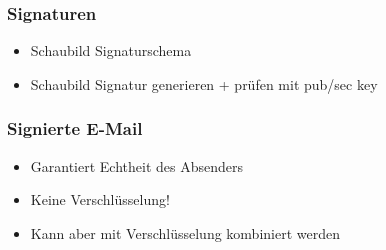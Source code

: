 \begin{frame}
  \frametitle{Signaturen}
  \begin{itemize}
    \item Schaubild Signaturschema
    \item Schaubild Signatur generieren + prüfen mit pub/sec key
  \end{itemize}
\end{frame}

\begin{frame}
  \frametitle{Signierte E-Mail}
  \begin{itemize}
    \item Garantiert Echtheit des Absenders
    \item Keine Verschlüsselung!
    \item Kann aber mit Verschlüsselung kombiniert werden
  \end{itemize}
\end{frame}
